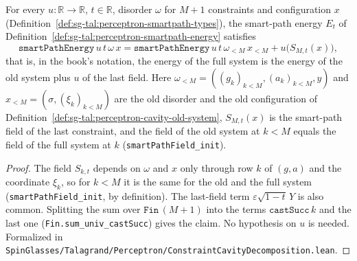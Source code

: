 \begin{lemma}\label{lem:sg-tal:perceptron-cavity-energy-split}
  \leanok
For every $u:\mathbb R\to\mathbb R$, $t\in\mathbb R$, disorder $\omega$ for $M+1$ constraints and configuration $x$
(Definition~\ref{def:sg-tal:perceptron-smartpath-types}), the smart-path energy $E_t$ of
Definition~\ref{def:sg-tal:perceptron-smartpath-energy} satisfies
\[
 \texttt{smartPathEnergy}\,u\,t\,\omega\,x
 =\texttt{smartPathEnergy}\,u\,t\,\omega_{<M}\,x_{<M}+u\bigl(S_{M,t}(x)\bigr),
\]
that is, in the book's notation, the energy of the full system is the energy of the old system plus $u$ of the last field. Here
$\omega_{<M}=((g_k)_{k<M},(a_k)_{k<M},y)$ and $x_{<M}=(\sigma,(\xi_k)_{k<M})$ are the old disorder and the old configuration of
Definition~\ref{def:sg-tal:perceptron-cavity-old-system}, $S_{M,t}(x)$ is the smart-path field of the last constraint, and the field of
the old system at $k<M$ equals the field of the full system at $k$ (\texttt{smartPathField\_init}).
\end{lemma}
\begin{proof}
  \leanok
The field $S_{k,t}$ depends on $\omega$ and $x$ only through row $k$ of $(g,a)$ and the coordinate $\xi_k$, so for $k<M$ it is the same
for the old and the full system (\texttt{smartPathField\_init}, by definition). The last-field term $\varepsilon\sqrt{1-t}\,Y$ is also
common. Splitting the sum over $\texttt{Fin}\,(M+1)$ into the terms $\texttt{castSucc}\,k$ and the last one
(\texttt{Fin.sum\_univ\_castSucc}) gives the claim. No hypothesis on $u$ is needed. Formalized in
\texttt{SpinGlasses/Talagrand/Perceptron/ConstraintCavityDecomposition.lean}.
\end{proof}

